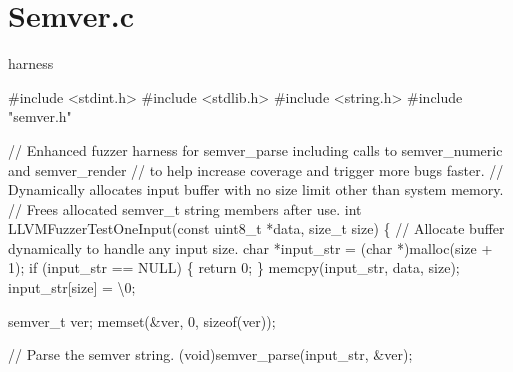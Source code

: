 \documentclass[
  a4paper,
]{scrreprt}
\newenvironment{Shaded}{\begin{snugshade}}{\end{snugshade}}
\newcommand{\CharTok}[1]{\textcolor[rgb]{0.00,0.50,0.00}{#1}}
\newcommand{\CommentTok}[1]{\textcolor[rgb]{0.41,0.41,0.41}{#1}}
\newcommand{\ControlFlowTok}[1]{\textcolor[rgb]{0.85,0.12,0.09}{#1}}
\newcommand{\DataTypeTok}[1]{\textcolor[rgb]{0.47,0.16,0.63}{#1}}
\newcommand{\DecValTok}[1]{\textcolor[rgb]{0.47,0.16,0.63}{#1}}
\newcommand{\ImportTok}[1]{\textcolor[rgb]{0.33,0.33,0.33}{#1}}
\newcommand{\KeywordTok}[1]{\textcolor[rgb]{0.85,0.12,0.09}{#1}}
\newcommand{\NormalTok}[1]{\textcolor[rgb]{0.33,0.33,0.33}{#1}}
\newcommand{\OperatorTok}[1]{\textcolor[rgb]{0.00,0.46,0.62}{#1}}
\newcommand{\PreprocessorTok}[1]{\textcolor[rgb]{0.47,0.16,0.63}{#1}}
\newcommand{\SpecialCharTok}[1]{\textcolor[rgb]{0.00,0.46,0.62}{#1}}
\theoremstyle{definition}
\theoremstyle{remark}
\begin{document}
\section{Semver.c}\label{semver.c}

harness

\begin{Shaded}
\begin{Highlighting}[numbers=left,,]
\PreprocessorTok{\#include }\ImportTok{\textless{}stdint.h\textgreater{}}
\PreprocessorTok{\#include }\ImportTok{\textless{}stdlib.h\textgreater{}}
\PreprocessorTok{\#include }\ImportTok{\textless{}string.h\textgreater{}}
\PreprocessorTok{\#include }\ImportTok{"semver.h"}

\CommentTok{// Enhanced fuzzer harness for semver\_parse including calls to semver\_numeric and semver\_render}
\CommentTok{// to help increase coverage and trigger more bugs faster.}
\CommentTok{// Dynamically allocates input buffer with no size limit other than system memory.}
\CommentTok{// Frees allocated semver\_t string members after use.}
\DataTypeTok{int}\NormalTok{ LLVMFuzzerTestOneInput}\OperatorTok{(}\DataTypeTok{const} \DataTypeTok{uint8\_t} \OperatorTok{*}\NormalTok{data}\OperatorTok{,} \DataTypeTok{size\_t}\NormalTok{ size}\OperatorTok{)} \OperatorTok{\{}
    \CommentTok{// Allocate buffer dynamically to handle any input size.}
    \DataTypeTok{char} \OperatorTok{*}\NormalTok{input\_str }\OperatorTok{=} \OperatorTok{(}\DataTypeTok{char} \OperatorTok{*)}\NormalTok{malloc}\OperatorTok{(}\NormalTok{size }\OperatorTok{+} \DecValTok{1}\OperatorTok{);}
    \ControlFlowTok{if} \OperatorTok{(}\NormalTok{input\_str }\OperatorTok{==}\NormalTok{ NULL}\OperatorTok{)} \OperatorTok{\{}
        \ControlFlowTok{return} \DecValTok{0}\OperatorTok{;}
    \OperatorTok{\}}
\NormalTok{    memcpy}\OperatorTok{(}\NormalTok{input\_str}\OperatorTok{,}\NormalTok{ data}\OperatorTok{,}\NormalTok{ size}\OperatorTok{);}
\NormalTok{    input\_str}\OperatorTok{[}\NormalTok{size}\OperatorTok{]} \OperatorTok{=} \CharTok{\textquotesingle{}}\SpecialCharTok{\textbackslash{}0}\CharTok{\textquotesingle{}}\OperatorTok{;}

\NormalTok{    semver\_t ver}\OperatorTok{;}
\NormalTok{    memset}\OperatorTok{(\&}\NormalTok{ver}\OperatorTok{,} \DecValTok{0}\OperatorTok{,} \KeywordTok{sizeof}\OperatorTok{(}\NormalTok{ver}\OperatorTok{));}

    \CommentTok{// Parse the semver string.}
    \OperatorTok{(}\DataTypeTok{void}\OperatorTok{)}\NormalTok{semver\_parse}\OperatorTok{(}\NormalTok{input\_str}\OperatorTok{,} \OperatorTok{\&}\NormalTok{ver}\OperatorTok{);}


\end{Highlighting}
\end{Shaded}
\end{document}
